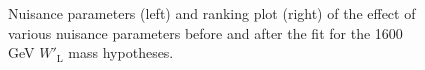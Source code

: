 \begin{figure}[H]
  \centering
  \caption{Nuisance parameters (left) and ranking plot (right) of the effect of various nuisance parameters before and after the fit for the 1600 GeV $W'_{\text{L}}$ mass hypotheses.}
  \label{fig:NuisParAndRanking_WpLH1600}
\end{figure}

